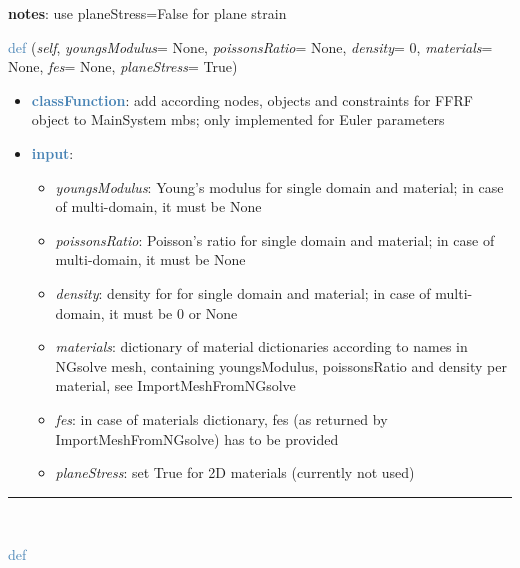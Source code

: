 \begin{itemize}[leftmargin=1.4cm]
\begin{itemize}[leftmargin=1.4cm]
\begin{itemize}[leftmargin=1.4cm]
\begin{itemize}[leftmargin=0.5cm]
\begin{itemize}[leftmargin=1.4cm]
\begin{itemize}[leftmargin=1.4cm]
\begin{itemize}[leftmargin=1.4cm]
\begin{itemize}[leftmargin=0.5cm]
\begin{itemize}[leftmargin=0.7cm]
{\bf notes}: use planeStress=False for plane strain
\vspace{24pt}\end{itemize}
%
\begin{flushleft}
\noindent \textcolor{steelblue}{def {\bf {}}}\label{sec:FEM:KirchhoffMaterial(MaterialBaseClass):__init__}
({\it self}, {\it youngsModulus}= None, {\it poissonsRatio}= None, {\it density}= 0, {\it materials}= None, {\it fes}= None, {\it planeStress}= True)
\end{flushleft}
\setlength{\itemindent}{0.7cm}
\begin{itemize}[leftmargin=0.7cm]
\item[--]\textcolor{steelblue}{\bf classFunction}: add according nodes, objects and constraints for FFRF object to MainSystem mbs; only implemented for Euler parameters
\item[--]\textcolor{steelblue}{\bf input}: \vspace{-6pt}
\begin{itemize}[leftmargin=1.2cm]
\setlength{\itemindent}{-0.7cm}
\item[]{\it youngsModulus}: Young's modulus for single domain and material; in case of multi-domain, it must be None
\item[]{\it poissonsRatio}: Poisson's ratio for single domain and material; in case of multi-domain, it must be None
\item[]{\it density}: density for for single domain and material; in case of multi-domain, it must be 0 or None
\item[]{\it materials}: dictionary of material dictionaries according to names in NGsolve mesh, containing youngsModulus, poissonsRatio and density per material, see ImportMeshFromNGsolve
\item[]{\it fes}: in case of materials dictionary, fes (as returned by ImportMeshFromNGsolve) has to be provided
\item[]{\it planeStress}: set True for 2D materials (currently not used)
\end{itemize}
\vspace{12pt}\end{itemize}
%
\noindent\rule{8cm}{0.75pt}\vspace{1pt} \\ 
\begin{flushleft}
\noindent \textcolor{steelblue}{def {\bf {}}}\label{sec:FEM:KirchhoffMaterial(MaterialBaseClass):Strain2Stress}

\end{flushleft}
\end{itemize}
\end{itemize}
\end{itemize}
\end{itemize}
\end{itemize}
\end{itemize}
\end{itemize}
\end{itemize}
